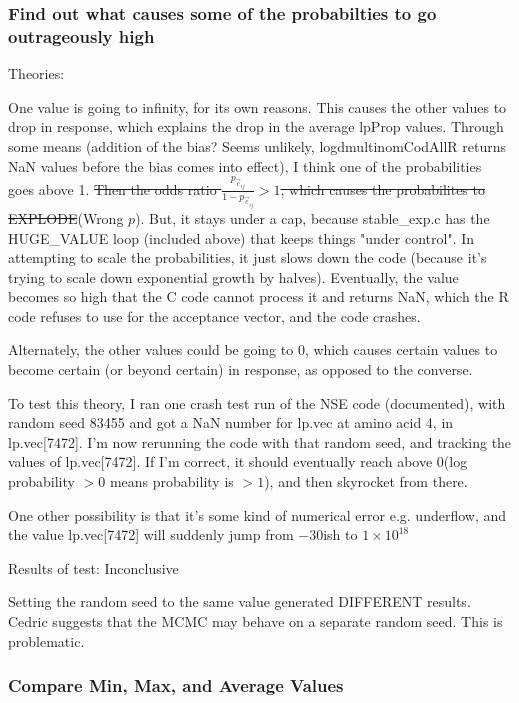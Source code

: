 \subsubsection{Find out what causes some of the probabilties to go outrageously high}

Theories:

One value is going to infinity, for its own reasons. This causes the other values to drop in response, which explains the drop in the average lpProp values. Through some means (addition of the bias? Seems unlikely, logdmultinomCodAllR returns NaN values before the bias comes into effect), I think one of the probabilities goes above 1. \sout{Then the odds ratio $\frac{p_{\vec{c}_{ij}}}{1 - p_{\vec{c}_{ij}}} > 1$, which causes the probabilites to EXPLODE}(Wrong $p$). But, it stays under a cap, because stable\_exp.c has the HUGE\_VALUE loop (included above) that keeps things "under control". In attempting to scale the probabilities, it just slows down the code (because it's trying to scale down exponential growth by halves). Eventually, the value becomes so high that the C code cannot process it and returns NaN, which the R code refuses to use for the acceptance vector, and the code crashes.

Alternately, the other values could be going to 0, which causes certain values to become certain (or beyond certain) in response, as opposed to the converse. 

To test this theory, I ran one crash test run of the NSE code (documented), with random seed 83455 and got a NaN number for lp.vec at amino acid 4, in lp.vec[7472]. I'm now rerunning the code with that random seed, and tracking the values of lp.vec[7472]. If I'm correct, it should eventually reach above 0(log probability $> 0$ means probability is $> 1$), and then skyrocket from there.

One other possibility is that it's some kind of numerical error e.g. underflow, and the value lp.vec[7472] will suddenly jump from $-30$ish to $1\times10^{18}$

Results of test: Inconclusive

Setting the random seed to the same value generated DIFFERENT results. Cedric suggests that the MCMC may behave on a separate random seed. This is problematic.


\subsubsection{Compare Min, Max, and Average Values}

